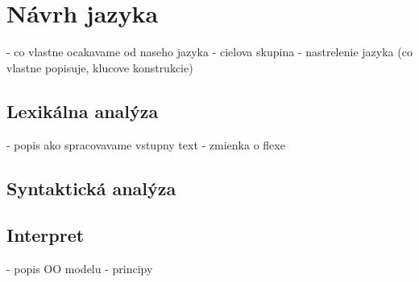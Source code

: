 \chapter{Návrh jazyka}
	- co vlastne ocakavame od naseho jazyka
	- cielova skupina
	- nastrelenie jazyka (co vlastne popisuje, klucove konstrukcie)
\section{Lexikálna analýza}
		- popis ako spracovavame vstupny text
		- zmienka o flexe	
\section{Syntaktická analýza}
\section{Interpret}
		- popis OO modelu
		- principy
	
